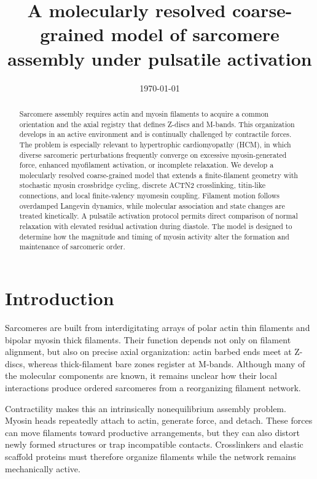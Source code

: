 \documentclass[11pt]{article}
\title{A molecularly resolved coarse-grained model of sarcomere assembly
under pulsatile activation}
\author{\todo{Author list}}
\date{\today}
\begin{document}
\maketitle

\begin{abstract}
Sarcomere assembly requires actin and myosin filaments to acquire a common
orientation and the axial registry that defines Z-discs and M-bands. This
organization develops in an active environment and is continually challenged
by contractile forces. The problem is especially relevant to hypertrophic
cardiomyopathy (HCM), in which diverse sarcomeric perturbations frequently
converge on excessive myosin-generated force, enhanced myofilament activation,
or incomplete relaxation. We develop a molecularly resolved coarse-grained
model that extends a finite-filament geometry with stochastic myosin
crossbridge cycling, discrete ACTN2 crosslinking, titin-like connections, and
local finite-valency myomesin coupling. Filament motion follows overdamped
Langevin dynamics, while molecular association and state changes are treated
kinetically. A pulsatile activation protocol permits direct comparison of
normal relaxation with elevated residual activation during diastole. The model
is designed to determine how the magnitude and timing of myosin activity alter
the formation and maintenance of sarcomeric order.
\end{abstract}


\section{Introduction}

Sarcomeres are built from interdigitating arrays of polar actin thin filaments
and bipolar myosin thick filaments. Their function depends not only on
filament alignment, but also on precise axial organization: actin barbed ends
meet at Z-discs, whereas thick-filament bare zones register at M-bands.
Although many of the molecular components are known, it remains unclear how
their local interactions produce ordered sarcomeres from a reorganizing
filament network.

Contractility makes this an intrinsically nonequilibrium assembly problem.
Myosin heads repeatedly attach to actin, generate force, and detach. These
forces can move filaments toward productive arrangements, but they can also
distort newly formed structures or trap incompatible contacts. Crosslinkers
and elastic scaffold proteins must therefore organize filaments while the
network remains mechanically active.
\end{document}
